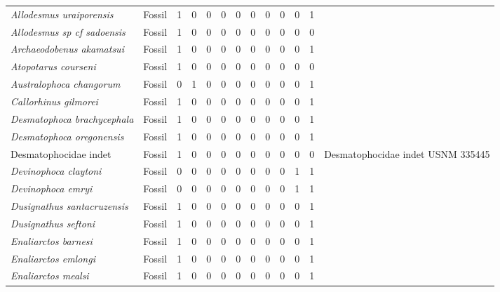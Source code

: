 \begin{longtable}{llccccccccccp{}}
\textit{Allodesmus uraiporensis} &
Fossil &
1 &
0 &
0 &
0 &
0 &
0 &
0 &
0 &
0 &
1 &
\\

\textit{Allodesmus sp cf sadoensis} &
Fossil &
1 &
0 &
0 &
0 &
0 &
0 &
0 &
0 &
0 &
0 &
\\

\textit{Archaeodobenus akamatsui} &
Fossil &
1 &
0 &
0 &
0 &
0 &
0 &
0 &
0 &
0 &
1 &
\\

\textit{Atopotarus courseni} &
Fossil &
1 &
0 &
0 &
0 &
0 &
0 &
0 &
0 &
0 &
0 &
\\

\textit{Australophoca changorum} &
Fossil &
0 &
1 &
0 &
0 &
0 &
0 &
0 &
0 &
0 &
1 &
\\

\textit{Callorhinus gilmorei} &
Fossil &
1 &
0 &
0 &
0 &
0 &
0 &
0 &
0 &
0 &
1 &
\\

\textit{Desmatophoca brachycephala} &
Fossil &
1 &
0 &
0 &
0 &
0 &
0 &
0 &
0 &
0 &
1 &
\\

\textit{Desmatophoca oregonensis} &
Fossil &
1 &
0 &
0 &
0 &
0 &
0 &
0 &
0 &
0 &
1 &
\\

Desmatophocidae indet &
Fossil &
1 &
0 &
0 &
0 &
0 &
0 &
0 &
0 &
0 &
0 &
Desmatophocidae indet USNM 335445\\

\textit{Devinophoca claytoni} &
Fossil &
0 &
0 &
0 &
0 &
0 &
0 &
0 &
0 &
1 &
1 &
\\

\textit{Devinophoca emryi} &
Fossil &
0 &
0 &
0 &
0 &
0 &
0 &
0 &
0 &
1 &
1 &
\\

\textit{Dusignathus santacruzensis} &
Fossil &
1 &
0 &
0 &
0 &
0 &
0 &
0 &
0 &
0 &
1 &
\\

\textit{Dusignathus seftoni} &
Fossil &
1 &
0 &
0 &
0 &
0 &
0 &
0 &
0 &
0 &
1 &
\\

\textit{Enaliarctos barnesi} &
Fossil &
1 &
0 &
0 &
0 &
0 &
0 &
0 &
0 &
0 &
1 &
\\

\textit{Enaliarctos emlongi} &
Fossil &
1 &
0 &
0 &
0 &
0 &
0 &
0 &
0 &
0 &
1 &
\\

\textit{Enaliarctos mealsi} &
Fossil &
1 &
0 &
0 &
0 &
0 &
0 &
0 &
0 &
0 &
1 &
\\


\end{longtable}
